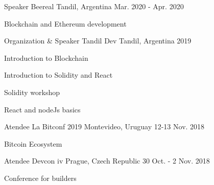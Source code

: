 \begin{cventries}
\cventry
{Speaker} %
{Beereal} %
{Tandil, Argentina} %
{Mar. 2020 - Apr. 2020} %
{ %
\begin{cvitems}
\item {Blockchain and Ethereum development}
\end{cvitems}
}
\cventry
{Organization \& Speaker} %
{Tandil Dev} %
{Tandil, Argentina} %
{2019} %
{ %
\begin{cvitems}
\item {Introduction to Blockchain}
\item {Introduction to Solidity and React}
\item {Solidity workshop}
\item {React and nodeJs basics}
\end{cvitems}
}
\cventry
{Atendee} %
{La Bitconf 2019} %
{Montevideo, Uruguay} %
{12-13 Nov. 2018} %
{ %
\begin{cvitems}
\item {Bitcoin Ecosystem}
\end{cvitems}
}
\cventry
{Atendee} %
{Devcon iv} %
{Prague, Czech Republic} %
{30 Oct. - 2 Nov. 2018} %
{ %
\begin{cvitems}
\item {Conference for builders}
\end{cvitems}
}

\end{cventries}

